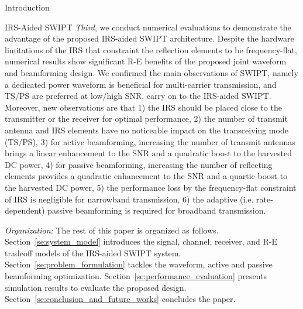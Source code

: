 \documentclass[journal]{IEEEtran}
\begin{document}
\begin{section}{Introduction}
\begin{subsection}{IRS-Aided SWIPT}
			\textit{Third}, we conduct numerical evaluations to demonstrate the advantage of the proposed IRS-aided SWIPT architecture.
			Despite the hardware limitations of the IRS that constraint the reflection elements to be frequency-flat, numerical results show significant R-E benefits of the proposed joint waveform and beamforming design. We confirmed the main observations of SWIPT, namely a dedicated power waveform is beneficial for multi-carrier transmission, and TS/PS are preferred at low/high SNR, carry on to the IRS-aided SWIPT. Moreover, new observations are that 1) the IRS should be placed close to the transmitter or the receiver for optimal performance, 2) the number of transmit antenna and IRS elements have no noticeable impact on the transceiving mode (TS/PS), 3) for active beamforming, increasing the number of transmit antennas brings a linear enhancement to the SNR and a quadratic boost to the harvested DC power, 4) for passive beamforming, increasing the number of reflecting elements provides a quadratic enhancement to the SNR and a quartic boost to the harvested DC power, 5) the performance loss by the frequency-flat constraint of IRS is negligible for narrowband transmission, 6) the adaptive (i.e. rate-dependent) passive beamforming is required for broadband transmission.

			\textit{Organization:} The rest of this paper is organized as follows. Section~\ref{se:system_model} introduces the signal, channel, receiver, and R-E tradeoff models of the IRS-aided SWIPT system. Section~\ref{se:problem_formulation} tackles the waveform, active and passive beamforming optimization. Section~\ref{se:performance_evaluation} presents simulation results to evaluate the proposed design. Section~\ref{se:conclusion_and_future_works} concludes the paper.


\end{subsection}
\end{section}
\end{document}
